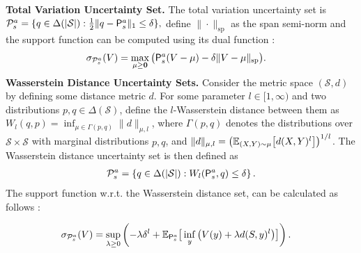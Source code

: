 \noindent \textbf{Total Variation Uncertainty Set.}
The total variation uncertainty set is  
$
    \mathcal{P}^a_s=\{q\in\Delta(|\mathcal{S}|): \frac{1}{2}\|q-\mathsf P^a_s\|_1\leq \delta \},
$
define $\| \cdot \|_{\mathrm{sp}}$ as the span semi-norm and the support function can be computed using its dual function \cite{iyengar2005robust}: 
\begin{align}\label{eq:tv dual}
    \sigma_{\cp^a_s}(V)%
    &=\max_{\mu \geq \mathbf{0}}\big(\kp^a_s(V-\mu)-\delta \|V-\mu\|_{\mathrm{sp}}  \big).
\end{align}
\textbf{Wasserstein Distance Uncertainty Sets.}
Consider the metric space $(\mathcal{S},d)$ by defining some distance metric $d$. For some parameter $l\in[1,\infty)$ and two distributions $p,q\in\Delta(\mathcal{S})$, define the $l$-Wasserstein distance between them as 
$W_l(q,p)=\inf_{\mu\in\Gamma(p,q)}\|d\|_{\mu,l}$, where $\Gamma(p,q)$ denotes the distributions over $\mathcal{S}\times\mathcal{S}$ with marginal distributions $p,q$, and $\|d\|_{\mu,l}=\big(\mathbb{E}_{(X,Y)\sim \mu}\big[d(X,Y)^l\big]\big)^{1/l}$. The Wasserstein distance uncertainty set is then defined as 
\begin{align}
    \mathcal{P}^a_s=\left\{q\in\Delta(|\mathcal{S}|): W_l(\mathsf P^a_s,q)\leq \delta \right\}.
\end{align}
The support function w.r.t. the Wasserstein distance set, can be calculated as follows \citep{gao2023distributionally}:

\begin{align}\label{eq:wd dual}
    &\sigma_{\mathcal{P}^a_s}(V)=\sup_{\lambda\geq 0}\left(-\lambda\delta^l+\mathbb{E}_{\mathsf P^a_{s}}\big[\inf_{y}\big(V(y)+\lambda d(S,y)^l \big)\big] \right).
\end{align}

